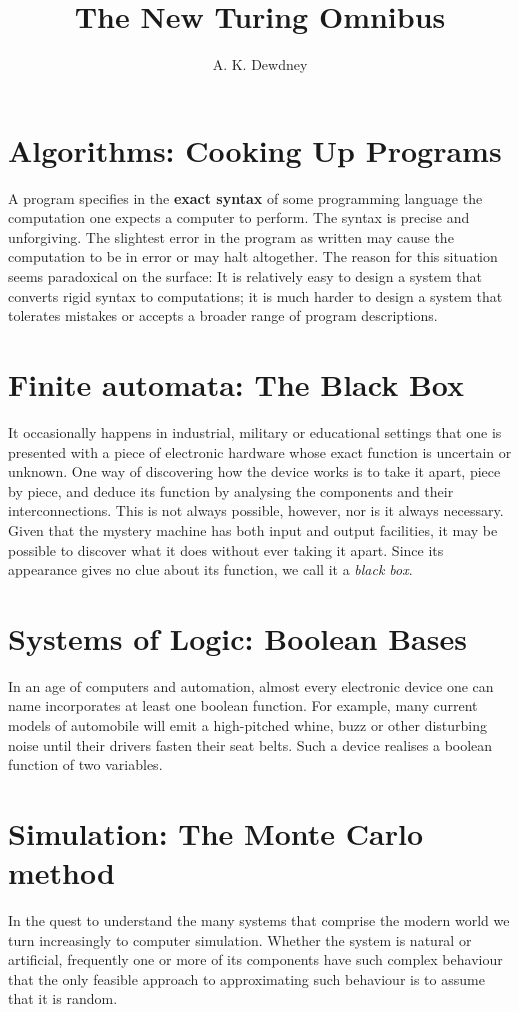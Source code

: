 \documentclass[a4paper]{article}
\begin{document}
\title{The New Turing Omnibus}
\author{A. K. Dewdney}
\maketitle
\tableofcontents
\newpage


\section{Algorithms: Cooking Up Programs}
A program specifies in the \textbf{exact syntax} of some programming language the computation one expects a computer to perform. The syntax is precise and unforgiving. The slightest error in the program as written may cause the computation to be in error or may halt altogether. The reason for this situation seems paradoxical on the surface: It is relatively easy to design a system that converts rigid syntax to computations; it is much harder to design a system that tolerates mistakes or accepts a broader range of program descriptions.

\section{Finite automata: The Black Box}
It occasionally happens in industrial, military or educational settings that one is presented with a piece of electronic hardware whose exact function is uncertain or unknown. One way of discovering how the device works is to take it apart, piece by piece, and deduce its function by analysing the components and their interconnections. This is not always possible, however, nor is it always necessary. Given that the mystery machine has both input and output facilities, it may be possible to discover what it does without ever taking it apart. Since its appearance gives no clue about its function, we call it a \textit{black box}.

\section{Systems of Logic: Boolean Bases}
In an age of computers and automation, almost every electronic device one can name incorporates at least one boolean function. For example, many current models of automobile will emit a high-pitched whine, buzz or other disturbing noise until their drivers fasten their seat belts. Such a device realises a boolean function of two variables.

\section{Simulation: The Monte Carlo method}
In the quest to understand the many systems that comprise the modern world we turn increasingly to computer simulation. Whether the system is natural or artificial, frequently one or more of its components have such complex behaviour that the only feasible approach to approximating such behaviour is to assume that it is random.
\end{document}
